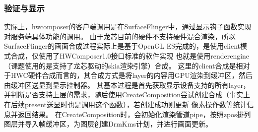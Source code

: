 \subsubsection{验证与显示}
实际上，hwcomposer的客户端调用是在SurfaceFlinger中，通过显示钩子函数实现对服务端具体功能的调用。
由于龙芯目前的硬件不支持硬件混合渲染，所以SurfaceFlinger的画面合成过程实际上是基于OpenGL ES完成的，是使用client模式合成，仅使用了HWComposer1.0接口标准的软件实现
也就是使用renderengine（课题使用的是支持了龙芯驱动的skia渲染引擎）合成。
这里的client合成是相对于HWC硬件合成而言的，其合成方式是将layer的内容用GPU渲染到缓冲区，然后由缓冲区送显到显示控制器。
其基本过程是首先获取显示设备支持的所有layer，并判断是否支持上层的需求，随后使用CreateComposition尝试创建合成（事实上在后续present送显时也是调用这个函数），若创建成功则更新
像素操作数等统计信息并返回结果。
在CreateComposition时，会初始化渲染管道pipe，按照zpos排列图层并导入帧缓冲区，为图层创建DrmKms计划，并进行画面更新。











